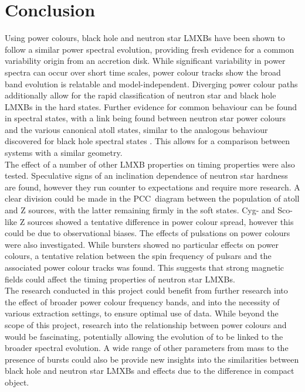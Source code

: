 \chapter{Conclusion}
\label{ch:conclusion}

Using power colours, black hole and neutron star \acp{LMXB} have been shown to follow a similar power spectral evolution, providing fresh evidence for a common variability origin from an accretion disk. While significant variability in power spectra can occur over short time scales, power colour tracks show the broad band evolution is relatable and model-independent. Diverging power colour paths additionally allow for the rapid classification of neutron star and black hole \acp{LMXB} in the hard states. Further evidence for common behaviour can be found in spectral states, with a link being found between neutron star power colours and the various canonical atoll states, similar to the analogous behaviour discovered for black hole spectral states \citep{heil2015power}. This allows for a comparison between systems with a similar geometry. \\

The effect of a number of other \ac{LMXB} properties on timing properties were also tested. Speculative signs of an inclination dependence of neutron star hardness are found, however they run counter to expectations and require more research. A clear division could be made in the \ac{PCC}~diagram between the population of atoll and Z sources, with the latter remaining firmly in the soft states. Cyg- and Sco-like Z sources showed a tentative difference in power colour spread, however this could be due to observational biases. The effects of pulsations on power colours were also investigated. While bursters showed no particular effects on power colours, a tentative relation between the spin frequency of pulsars and the associated power colour tracks was found. This suggests that strong magnetic fields could affect the timing properties of neutron star \acp{LMXB}. \\

The research conducted in this project could benefit from further research into the effect of broader power colour frequency bands, and into the necessity of various extraction settings, to ensure optimal use of data. While beyond the scope of this project, research into the relationship between power colours and \QPOs would be fascinating, potentially allowing the evolution of \QPOs to be linked to the broader spectral evolution. A wide range of other parameters from mass to the presence of bursts could also be provide new insights into the similarities between black hole and neutron star \acp{LMXB} and effects due to the difference in compact object.